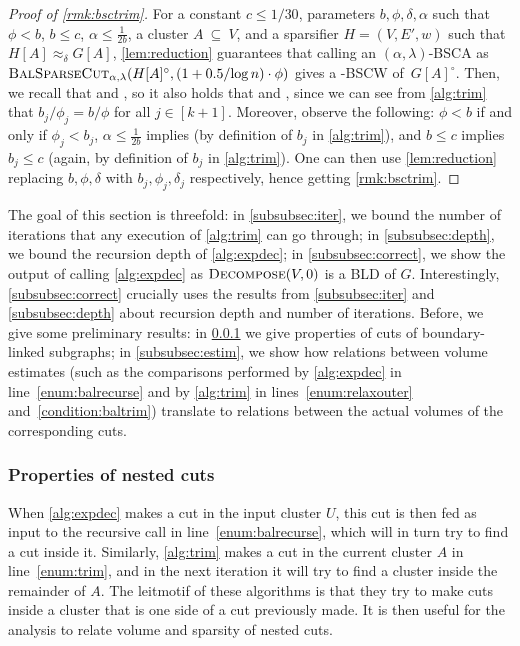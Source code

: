 \documentclass[epsfig,letter,11pt]{article}
\numberwithin{equation}{section}
\newcommand{\bsc}{\textsc{BalSparseCut}_{\alpha,\lambda}}
\newcommand{\ed}{\textsc{Decompose}}
\begin{document}
\begin{proof}[Proof of \cref{rmk:bsctrim}]
For  a constant $c \le 1/30$, parameters $b, \phi, \delta,\alpha$ such that $\phi < b$, $b \le c$, $ \alpha \le \frac{1}{2b}$, a cluster $A~\subseteq~V$, and a sparsifier  $H=(V,E',w)$ such that $H[A] \approx_\delta G[A]$, \cref{lem:reduction} guarantees that calling an $(\alpha,\lambda)$-BSCA as $\bsc(H[A]^\circ, (1+0.5/{\log n}) \cdot \phi)$ gives a  -BSCW of~$G[A]^\circ$. Then, we recall that  and , so it also holds that  and , since we can see from \cref{alg:trim} that $b_j/\phi_j=b/\phi$ for all $j \in [k+1]$. Moreover, observe the following: $\phi < b$ if and only if $\phi_j < b_j$, $ \alpha \le \frac{1}{2b}$ implies  (by definition of $b_j$ in \cref{alg:trim}), and $b \le c$ implies $b_j \le c$ (again, by definition of $b_j$ in \cref{alg:trim}). One can then use \cref{lem:reduction} replacing $b,\phi,\delta$ with $b_j,\phi_j,\delta_j$ respectively, hence getting \cref{rmk:bsctrim}.
\end{proof}

\noindent
The goal of this section is threefold: in \cref{subsubsec:iter}, we bound the number of iterations that any execution of \cref{alg:trim} can go through; in \cref{subsubsec:depth}, we bound the recursion depth of \cref{alg:expdec}; in \cref{subsubsec:correct}, we show the output of calling \cref{alg:expdec} as $\ed(V,0)$ is a BLD of $G$. Interestingly,  \cref{subsubsec:correct} crucially uses the results from \cref{subsubsec:iter} and  \cref{subsubsec:depth} about recursion depth and number of iterations. Before, we give some preliminary results: in \cref{subsubsec:nested} we give properties of cuts of boundary-linked subgraphs; in \cref{subsubsec:estim}, we show how relations between volume estimates (such as the comparisons performed by \cref{alg:expdec} in line~\eqref{enum:balrecurse} and by \cref{alg:trim} in lines~\eqref{enum:relaxouter} and~\eqref{condition:baltrim}) translate to relations between the actual volumes of the corresponding cuts.

\subsubsection{Properties of nested cuts}
\label{subsubsec:nested}
When \cref{alg:expdec} makes a cut in the input cluster $U$, this cut is then fed as input to the recursive call in line~\eqref{enum:balrecurse}, which will in turn try to find a cut inside it. Similarly, \cref{alg:trim} makes a cut in the current cluster $A$ in line~\eqref{enum:trim}, and in the next iteration it will try to find a cluster inside the remainder of $A$. The leitmotif of these algorithms is that they try to make cuts inside a cluster that is one side of a cut previously made. It is then useful for the analysis to relate volume and sparsity of nested cuts.
\end{document}
